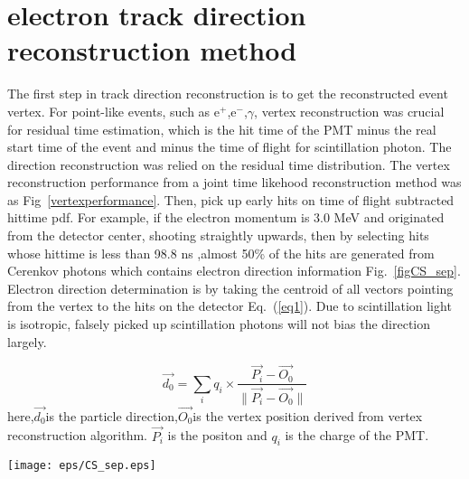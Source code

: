 \documentclass[a4paper,10pt]{cpc-hepnp}
\begin{document}
\section{electron track direction reconstruction method}
The first step in track direction reconstruction is to get the reconstructed event vertex.
For point-like events, such as e$^+$,e$^-$,$\gamma$, vertex reconstruction was crucial for 
residual time estimation, which is the hit time of the PMT minus the real start time of the event and minus the time of flight for
scintillation photon. The direction reconstruction was relied on the residual time distribution.
The vertex reconstruction performance from a joint time likehood reconstruction method was as Fig~\ref{vertexperformance}.
Then, pick up early hits on time of flight subtracted hittime pdf.
For example, if the electron momentum is 3.0 MeV and originated
from the detector center, shooting straightly upwards, then by selecting hits whose hittime is less than 98.8 ns ,almost 50\% of
the hits are generated from Cerenkov photons which contains electron direction information Fig.~\ref{figCS_sep}.
Electron direction determination is by taking the centroid of all vectors pointing from  the vertex to the hits on the
detector Eq.~(\ref{eq1}). Due to scintillation light is isotropic, falsely
picked up scintillation photons will not bias the direction largely.

\begin{equation}
\label{eq1}
\vec{d_0} = \sum_i{q_i\times{\frac{\vec{P_i}- \vec{O_0}}{\|\vec{P_i}-
\vec{O_0}\|}}}
\end{equation}
here,$\vec{d_0}$is the particle direction,$\vec{O_0}$is the vertex position
derived from vertex reconstruction algorithm.
 $\vec{P_i}$ is the positon and $q_i$ is the charge of the PMT.

\begin{center}
\texttt{[image: eps/CS\_sep.eps]}
\end{center}
\end{document}
